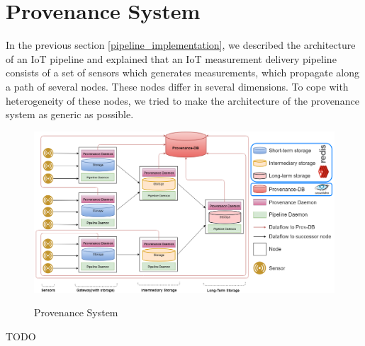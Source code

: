 \section{Provenance System}

In the previous section \ref{pipeline_implementation}, we described the architecture of an IoT pipeline and explained that an IoT measurement delivery pipeline consists of a set of sensors which generates measurements, which propagate along a path of several nodes. These nodes differ in several dimensions. To cope with heterogeneity of these nodes, we tried to make the architecture of the provenance system as generic as possible.

\begin{figure}[h]
\centering
\includegraphics[width=\linewidth]{figures/provenance_system.png}\\
\caption{Provenance System}
\label{provenance_system}
\end{figure}

TODO
